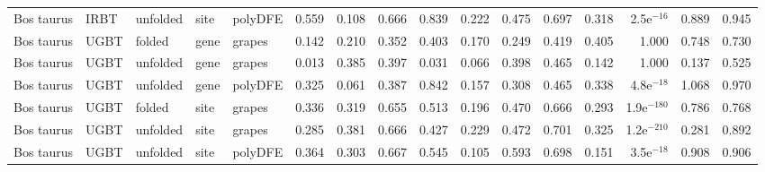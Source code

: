 \begin{longtable}{lllllrrrrrrrrrrr}
          Bos taurus &                      IRBT &  unfolded &  site &  polyDFE &                              0.559 &                               0.108 &                 0.666 &                 0.839 &                              0.222 &                               0.475 &                 0.697 &                 0.318 &  2.5e$^{-16}$ &  0.889 &  0.945 \\
          Bos taurus &                      UGBT &    folded &  gene &   grapes &                              0.142 &                               0.210 &                 0.352 &                 0.403 &                              0.170 &                               0.249 &                 0.419 &                 0.405 &         1.000 &  0.748 &  0.730 \\
          Bos taurus &                      UGBT &  unfolded &  gene &   grapes &                              0.013 &                               0.385 &                 0.397 &                 0.031 &                              0.066 &                               0.398 &                 0.465 &                 0.142 &         1.000 &  0.137 &  0.525 \\
          Bos taurus &                      UGBT &  unfolded &  gene &  polyDFE &                              0.325 &                               0.061 &                 0.387 &                 0.842 &                              0.157 &                               0.308 &                 0.465 &                 0.338 &  4.8e$^{-18}$ &  1.068 &  0.970 \\
          Bos taurus &                      UGBT &    folded &  site &   grapes &                              0.336 &                               0.319 &                 0.655 &                 0.513 &                              0.196 &                               0.470 &                 0.666 &                 0.293 & 1.9e$^{-180}$ &  0.786 &  0.768 \\
          Bos taurus &                      UGBT &  unfolded &  site &   grapes &                              0.285 &                               0.381 &                 0.666 &                 0.427 &                              0.229 &                               0.472 &                 0.701 &                 0.325 & 1.2e$^{-210}$ &  0.281 &  0.892 \\
          Bos taurus &                      UGBT &  unfolded &  site &  polyDFE &                              0.364 &                               0.303 &                 0.667 &                 0.545 &                              0.105 &                               0.593 &                 0.698 &                 0.151 &  3.5e$^{-18}$ &  0.908 &  0.906 \\

\end{longtable}
